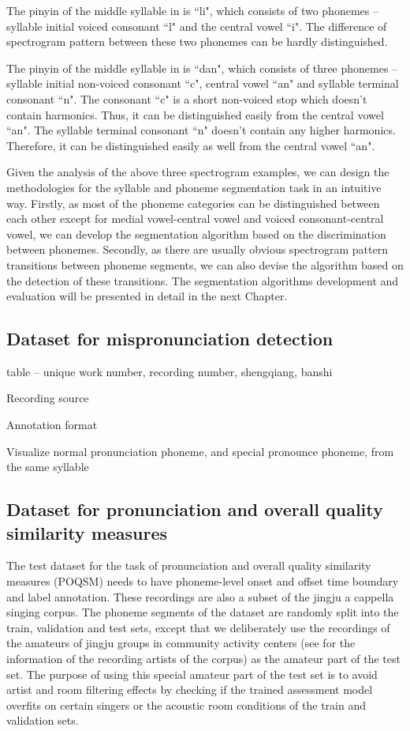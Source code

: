 The pinyin of the middle syllable in  is ``li", which consists of two phonemes -- syllable initial voiced consonant ``l" and the central vowel ``i". The difference of spectrogram pattern between these two phonemes can be hardly distinguished.

The pinyin of the middle syllable in  is ``dan", which consists of three phonemes -- syllable initial non-voiced consonant ``c", central vowel ``an" and syllable terminal consonant ``n". The consonant ``c" is a short non-voiced stop which doesn't contain harmonics. Thus, it can be distinguished easily from the central vowel ``an". The syllable terminal consonant ``n" doesn't contain any higher harmonics. Therefore, it can be distinguished easily as well from the central vowel ``an".

Given the analysis of the above three spectrogram examples, we can design the methodologies for the syllable and phoneme segmentation task in an intuitive way. Firstly, as most of the phoneme categories can be distinguished between each other except for medial vowel-central vowel and voiced consonant-central vowel, we can develop the segmentation algorithm based on the discrimination between phonemes. Secondly, as there are usually obvious spectrogram pattern transitions between phoneme segments, we can also devise the algorithm based on the detection of these transitions. The segmentation algorithms development and evaluation will be presented in detail in the next Chapter.

\subsection{Dataset for mispronunciation detection}

table -- unique work number, recording number, shengqiang, banshi 

Recording source

Annotation format

Visualize normal pronunciation phoneme, and special pronounce phoneme, from the same syllable

\subsection{Dataset for pronunciation and overall quality similarity measures}

The test dataset for the task of pronunciation and overall quality similarity measures (POQSM) needs to have phoneme-level onset and offset time boundary and label annotation. These recordings are also a subset of the jingju a cappella singing corpus. The phoneme segments of the dataset are randomly split into the train, validation and test sets, except that we deliberately use the recordings of the amateurs of jingju groups in community activity centers (see  for the information of the recording artists of the corpus) as the amateur part of the test set. The purpose of using this special amateur part of the test set is to avoid artist and room filtering effects by checking if the trained assessment model overfits on certain singers or the acoustic room conditions of the train and validation sets.


